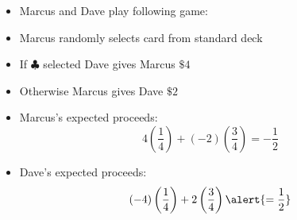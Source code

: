 \documentclass{ximera}
\begin{document}
\begin{itemize}
\item Marcus and Dave play following game:
\item Marcus randomly selects card from standard deck
\item If $\clubsuit$ selected Dave gives Marcus $\$4$
\item Otherwise Marcus gives Dave $\$2$
\item Marcus's expected proceeds:
\[4\left(\frac{1}{4}\right)+\left(-2\right)\left(\frac{3}{4}\right)=-\frac{1}{2}\]
\item Dave's expected proceeds:
\[\left(-4\right)\left(\frac{1}{4}\right)
+2\left(\frac{3}{4}\right)
\alert{=\frac{1}{2}}\]
\end{itemize}
\end{document}

